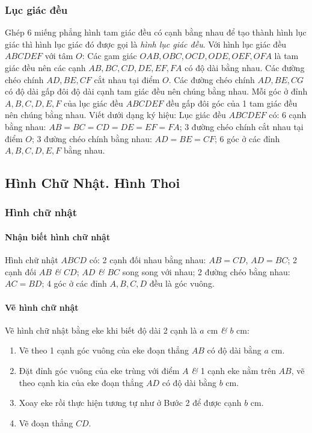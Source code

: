 \documentclass{article}
\numberwithin{equation}{section}
\begin{document}
\subsubsection{Lục giác đều}
Ghép 6 miếng phẳng hình tam giác đều có cạnh bằng nhau để tạo thành hình lục giác thì hình lục giác đó được gọi là \emph{hình lục giác đều}. Với hình lục giác đều $ABCDEF$ với tâm $O$: Các gam giác $OAB,OBC,OCD,ODE,OEF,OFA$ là tam giác đều nên các cạnh $AB,BC,CD,DE,EF,FA$ có độ dài bằng nhau. Các đường chéo chính $AD,BE,CF$ cắt nhau tại điểm $O$. Các đường chéo chính $AD,BE,CG$ có độ dài gấp đôi độ dài cạnh tam giác đều nên chúng bằng nhau. Mỗi góc ở đỉnh $A,B,C,D,E,F$ của lục giác đều $ABCDEF$ đều gấp đôi góc của 1 tam giác đều nên chúng bằng nhau. Viết dưới dạng ký hiệu: Lục giác đều $ABCDEF$ có: 6 cạnh bằng nhau: $AB = BC = CD = DE = EF = FA$; 3 đường chéo chính cắt nhau tại điểm $O$; 3 đường chéo chính bằng nhau: $AD = BE = CF$; 6 góc ở các đỉnh $A,B,C,D,E,F$ bằng nhau.


\subsection{Hình Chữ Nhật. Hình Thoi}

\subsubsection{Hình chữ nhật}

\paragraph{Nhận biết hình chữ nhật}
Hình chữ nhật $ABCD$ có: 2 cạnh đối nhau bằng nhau: $AB = CD$, $AD = BC$; 2 cạnh đối $AB$ \textit{\&} $CD$; $AD$ \textit{\&} $BC$ song song với nhau; 2 đường chéo bằng nhau: $AC = BD$; 4 góc ở các đỉnh $A,B,C,D$ đều là góc vuông.

\paragraph{Vẽ hình chữ nhật}
Vẽ hình chữ nhật bằng eke khi biết độ dài 2 cạnh là $a$ cm \textit{\&} $b$ cm:
\begin{enumerate}
	\item Vẽ theo 1 cạnh góc vuông của eke đoạn thẳng $AB$ có độ dài bằng $a$ cm.
	\item Đặt đỉnh góc vuông của eke trùng với điểm $A$ \textit{\&} 1 cạnh eke nằm trên $AB$, vẽ theo cạnh kia của eke đoạn thẳng $AD$ có độ dài bằng $b$ cm.
	\item Xoay eke rồi thực hiện tương tự như ở Bước 2 để được cạnh $b$ cm.
	\item Vẽ đoạn thẳng $CD$.
\end{enumerate}
\end{document}
